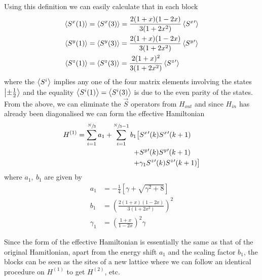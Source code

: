 \documentclass[../rsrg.tex,../../main.tex]{subfiles}
\begin{document}
Using this definition we can easily calculate that in each block
\begin{equation}
\begin{split}
    \expval{S^{x}(1)}&=\expval{S^{x}(3)}=\frac{2(1+x)(1-2x)}{3(1+2x^{2})}\expval{S^{x}{}'}\\
    \expval{S^{y}(1)}&=\expval{S^{y}(3)}=\frac{2(1+x)(1-2x)}{3(1+2x^{2})}\expval{S^{y}{}'}\\
    \expval{S^{z}(1)}&=\expval{S^{z}(3)}=\frac{2(1+x)^{2}}{3(1+2x^{2})}\expval{S^{z}{}'}
\end{split}
\end{equation}
where the $\expval{S^{i}}$ implies any one of the four matrix elements involving the states $\ket{\pm\frac{1}{2}}$ and the equality $\expval{S^{i}(1)}=\expval{S^{i}(3)}$ is due to the even parity of the states. From the above, we can eliminate the $\vec{S}$ operators from $H_{out}$ and since $H_{in}$ has already been diagonalised we can form the effective Hamiltonian
\begin{equation}
\begin{split}
     H^{(1)}=\sum_{i=1}^{\sfrac{N}{3}}a_{1}+\sum_{i=1}^{\sfrac{N}{3}-1}b_{1}\big[&S^{x}{}'(k)S^{x}{}'(k+1)\\+&S^{y}{}'(k)S^{y}{}'(k+1)\\+&\gamma_{1}S^{z}{}'(k)S^{z}{}'(k+1)\big]\\
\end{split}
\end{equation}
where $a_{1},\ b_{1}$ are given by
\begin{equation}
    \begin{split}
        a_{1}&=-\frac{1}{4}[\gamma+\sqrt{\gamma^{2}+8}]\\
        b_{1}&=\left(\frac{2(1+x)(1-2x)}{3(1+2x^{2})}\right)^{2}\\
        \gamma_{1}&=\left(\frac{1+x}{1-2x}\right)^{2}\gamma
    \end{split}
\end{equation}

Since the form of the effective Hamiltonian is essentially the same as that of the original Hamitlonian, apart from the energy shift $a_{1}$ and the scaling factor $b_{1}$, the blocks can be seen as the sites of a new lattice where we can follow an identical procedure on $H^{(1)}$ to get $H^{(2)}$, etc.\\
\end{document}

